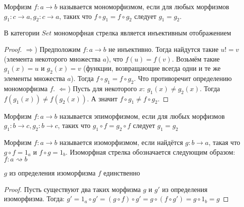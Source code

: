 


\begin{defn}
  Морфизм $f \colon a \to b$ называется мономорфизмом, если для любых морфизмов
  $g_1 \colon c \to a, g_2 \colon c \to a$, таких что $f \circ g_1 = f \circ g_2$
  следует $g_1 = g_2$.
\end{defn}

\begin{thm}
  В категории $Set$ мономорфная стрелка является инъективным отображением
\end{thm}
\begin{proof}
  $\Rightarrow$) Предположим $f \colon a \to b$ не инъективно. Тогда найдутся такие $u != v$
  (элемента некоторого множества $a$), что $f(u) = f(v)$. Возьмём такие
  $g_1(x) = u$ и $g_2(x) = v$ (функции, возвращающие всегда одни и те же
  элементы множества $a$). Тогда $f \circ g_1 = f \circ g_2$. Что противоречит
  определению мономорфизма $f$.
  $\Leftarrow$) Пусть для некоторого $x$: $g_1(x) \ne g_2(x)$. Тогда $f(g_1(x))
  \ne f(g_2(x))$. А значит $f \circ g_1 \ne f \circ g_2$.
\end{proof}

\begin{defn}
  Морфизм $f \colon a \to b$ называется эпиморфизмом, если для любых морфизмов
  $g_1 \colon b \to c, g_2 \colon b \to c$, таких что $g_1 \circ f = g_2 \circ f$
  следует $g_1 = g_2$
\end{defn}

\begin{defn}
  Морфизм $f \colon a \to b$ называется изоморфизмом, если найдётся
  $g \colon b \to a$, такая что $g \circ f = 1_a$ и $f \circ g = 1_b$.
  Изоморфная стрелка обозначается следующим образом:
  $f \colon a \rightsquigarrow b$
\end{defn}

\begin{stmt}
  $g$ из определения изоморфизма $f$ единственно
\end{stmt}
\begin{proof}
  Пусть существуют два таких морфизма $g$ и $g'$ из определения изоморфизма. Тогда:
  $g' = 1_a \circ g' = (g \circ f) \circ g' = g \circ (f \circ g') = g \circ 1_b = g$
\end{proof}

